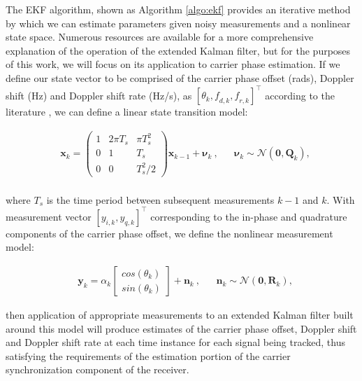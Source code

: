 \documentclass[11pt]{article}
\newcounter{algo}
\begin{document}
\noindent The EKF algorithm, shown as Algorithm \ref{algo:ekf} provides an iterative method by which we can estimate parameters given noisy measurements and a nonlinear state space. Numerous resources are available for a more comprehensive explanation of the operation of the extended Kalman filter, but for the purposes of this work, we will focus on its application to carrier phase estimation. If we define our state vector to be comprised of the carrier phase offset (rads), Doppler shift (Hz) and Doppler shift rate (Hz/s), as $[\theta_k,\mathit{f_{d,k}},\mathit{f_{r,k}}]^\intercal$ according to the literature \cite{vila18}, we can define a linear state transition model:

\begin{align}
&\mathbf{x}_k = \begin{pmatrix}
  1 & 2 \pi T_{s} & \pi T_{s}^{2} \\
  0 & 1 & T_s \\
  0 & 0 & T_{s}^{2}/2 
 \end{pmatrix}\mathbf{x}_{k-1} + \bm{\nu}_{k}~, & & \bm{\nu}_{k}\sim \mathcal{N}(\mathbf{0},\mathbf{Q}_{k}), \label{eq:system_state} \\
\end{align}

\noindent where $T_s$ is the time period between subsequent measurements $k-1$ and $k$. With measurement vector $[y_{i,k},y_{q,k}]^\intercal$ corresponding to the in-phase and quadrature components of the carrier phase offset, we define the nonlinear measurement model:

\begin{align}
&\mathbf{y}_k = \alpha_k \begin{bmatrix}cos(\theta_k)\\sin(\theta_k)\end{bmatrix} + \mathbf{n}_{k} ~, & & \mathbf{n}_{k}\sim \mathcal{N}(\mathbf{0},\mathbf{R}_{k}), 
\label{eq:system_meas}
\end{align}

\noindent then application of appropriate measurements to an extended Kalman filter built around this model will produce estimates of the carrier phase offset, Doppler shift and Doppler shift rate at each time instance for each signal being tracked, thus satisfying the requirements of the estimation portion of the carrier synchronization component of the receiver.
\end{document}
